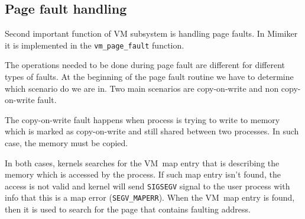 %
%

\subsection{Page fault handling}

Second important function of VM subsystem is handling page faults.
In Mimiker it is implemented in the \texttt{vm_page_fault} function.

The operations needed to be done during page fault are different for different types of faults.
At the beginning of the page fault routine we have to determine which scenario do we are in.
Two main scenarios are copy-on-write and non copy-on-write fault.

The copy-on-write fault happens when process is trying to write to memory which is marked as copy-on-write and still shared between two processes.
In such case, the memory must be copied.

In both cases, kernels searches for the VM~map entry that is describing the memory which is accessed by the process.
If such map entry isn't found, the access is not valid and kernel will send {\tt SIGSEGV} signal to the user process with info that
this is a map error (\texttt{SEGV_MAPERR}).
When the VM~map entry is found, then it is used to search for the page that contains faulting address.

%

